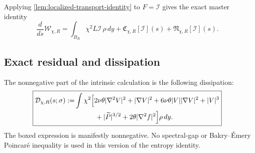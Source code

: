 \documentclass[11pt]{amsart}
\numberwithin{equation}{section}
\theoremstyle{plain}
\theoremstyle{definition}
\theoremstyle{remark}
\newcommand{\Wloc}{\mathcal W}
\newcommand{\Diss}{\mathcal D}
\begin{document}
Applying \cref{lem:localized-transport-identity} to \(F=\mathcal I\) gives
the exact master identity
\begin{equation}\label{eq:dW-ds-master}
	\frac{d}{ds}\Wloc_{\chi,R}
	=\int_{B_R}\chi^2 L\mathcal I\,\rho\,dy
	+\mathfrak C_{\chi,R}[\mathcal I](s)
	+\mathfrak N_{\chi,R}[\mathcal I](s).
\end{equation}

\subsection{Exact residual and dissipation}

The nonnegative part of the intrinsic calculation is the following
dissipation:
\begin{equation}\label{eq:dissipation}
\boxed{
\begin{aligned}
	\Diss_{\chi,R}(s;\sigma)
	:=
	&\int\chi^2\Bigl[2\nu\theta|\nabla^2 V|^2
	+|\nabla V|^2
	+6\nu\theta|V||\nabla V|^2
	+|V|^3\\
	&\qquad\quad+|\widetilde P|^{3/2}
	+2\theta|\nabla^2 f|^2\Bigr]\rho\,dy.
\end{aligned}}
\end{equation}
The boxed expression is manifestly nonnegative.  No spectral-gap or
Bakry--\'Emery Poincar\'e inequality is used in this version of the entropy
identity.
\end{document}
